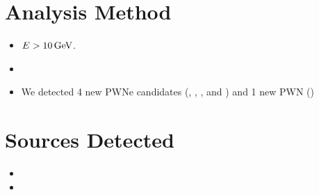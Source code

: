 \section{Analysis Method}

\begin{itemize}
  \item $E>10\,\text{GeV}$.
  \item
  \item 

    We detected 4 new PWNe candidates (, ,
    ,
    and )
    and 1 new PWN ()



\end{itemize}

\section{Sources Detected}

\begin{itemize}
  \item
  \item
\end{itemize}
